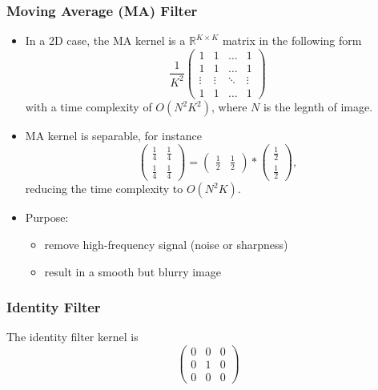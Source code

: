 \documentclass[twocolumn,landscape,10pt]{article}
\theoremstyle{definition}
\begin{document}
\subsubsection{Moving Average (MA) Filter}

\begin{itemize}
    \item In a 2D case, the MA kernel is a
        $\mathbb{R}^{K\times K}$ matrix in the following form
        \[
            \frac{1}{K^2}
            \begin{pmatrix}
                1 & 1 & \ldots & 1 \\
                1 & 1 & \ldots & 1 \\
                \vdots & \vdots & \ddots & \vdots \\
                1 & 1 & \ldots & 1
            \end{pmatrix} 
        \]
        with a time complexity of $O(N^2K^2)$, where $N$ is the legnth of image.
    \item MA kernel is separable, for instance
        \[
            \begin{pmatrix}
                \frac{1}{4} & \frac{1}{4} \\[4px]
                \frac{1}{4} & \frac{1}{4}
            \end{pmatrix} 
            =
            \begin{pmatrix}
                \frac{1}{2} & \frac{1}{2}
            \end{pmatrix} 
            *
            \begin{pmatrix}
                \frac{1}{2} \\[4px]
                \frac{1}{2}
            \end{pmatrix},
        \]
        reducing the time complexity to $O(N^2K)$.
    \item Purpose:
        \begin{itemize}
            \item remove high-frequency signal (noise or sharpness)
            \item result in a smooth but blurry image
        \end{itemize} 
\end{itemize} 

\subsubsection{Identity Filter}

The identity filter kernel is
\[
    \begin{pmatrix}
        0 & 0 & 0 \\
        0 & 1 & 0 \\
        0 & 0 & 0
    \end{pmatrix} 
\]
\end{document}
